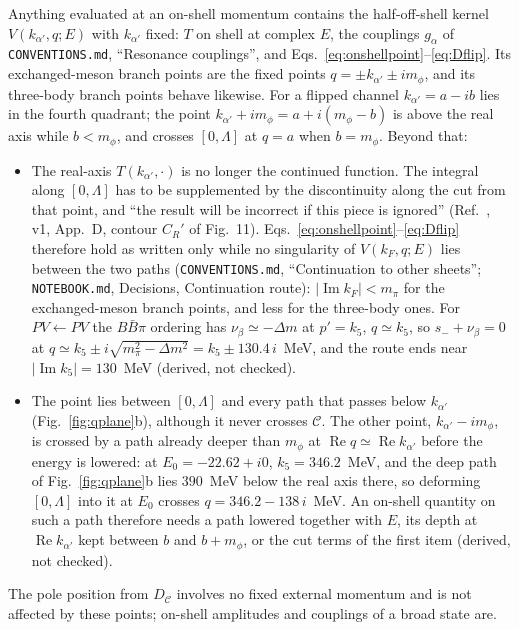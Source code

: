 \documentclass[11pt]{article}
\newcommand{\file}[1]{\nolinkurl{#1}}
\begin{document}
Anything evaluated at an on-shell momentum contains the half-off-shell kernel $V(k_{\alpha'},q;E)$ with $k_{\alpha'}$ fixed: $T$ on shell at complex $E$, the couplings $g_\alpha$ of \file{CONVENTIONS.md}, ``Resonance couplings'', and Eqs.~\eqref{eq:onshellpoint}--\eqref{eq:Dflip}. Its exchanged-meson branch points are the fixed points $q=\pm k_{\alpha'}\pm im_\phi$, and its three-body branch points behave likewise. For a flipped channel $k_{\alpha'}=a-ib$ lies in the fourth quadrant; the point $k_{\alpha'}+im_\phi=a+i(m_\phi-b)$ is above the real axis while $b<m_\phi$, and crosses $[0,\Lambda]$ at $q=a$ when $b=m_\phi$. Beyond that:
\begin{itemize}
\item The real-axis $T(k_{\alpha'},\cdot)$ is no longer the continued function. The integral along $[0,\Lambda]$ has to be supplemented by the discontinuity along the cut from that point, and ``the result will be incorrect if this piece is ignored'' (Ref.~\cite{Wu:2026wxb}, v1, App.~D, contour $C_R'$ of Fig.~11). Eqs.~\eqref{eq:onshellpoint}--\eqref{eq:Dflip} therefore hold as written only while no singularity of $V(k_F,q;E)$ lies between the two paths (\file{CONVENTIONS.md}, ``Continuation to other sheets''; \file{NOTEBOOK.md}, Decisions, Continuation route): $|\operatorname{Im}k_F|<m_\pi$ for the exchanged-meson branch points, and less for the three-body ones. For $PV\leftarrow PV$ the $B\bar B\pi$ ordering has $\nu_\beta\simeq-\Delta m$ at $p'=k_5$, $q\simeq k_5$, so $s_-+\nu_\beta=0$ at $q\simeq k_5\pm i\sqrt{m_\pi^2-\Delta m^2}=k_5\pm130.4\,i$~MeV, and the route ends near $|\operatorname{Im}k_5|=130$~MeV (derived, not checked).
\item The point lies between $[0,\Lambda]$ and every path that passes below $k_{\alpha'}$ (Fig.~\ref{fig:qplane}b), although it never crosses $\mathcal C$. The other point, $k_{\alpha'}-im_\phi$, is crossed by a path already deeper than $m_\phi$ at $\operatorname{Re}q\simeq\operatorname{Re}k_{\alpha'}$ before the energy is lowered: at $E_0=-22.62+i0$, $k_5=346.2$~MeV, and the deep path of Fig.~\ref{fig:qplane}b lies $390$~MeV below the real axis there, so deforming $[0,\Lambda]$ into it at $E_0$ crosses $q=346.2-138\,i$~MeV. An on-shell quantity on such a path therefore needs a path lowered together with $E$, its depth at $\operatorname{Re}k_{\alpha'}$ kept between $b$ and $b+m_\phi$, or the cut terms of the first item (derived, not checked).
\end{itemize}
The pole position from $D_{\mathcal C}$ involves no fixed external momentum and is not affected by these points; on-shell amplitudes and couplings of a broad state are.
\end{document}
